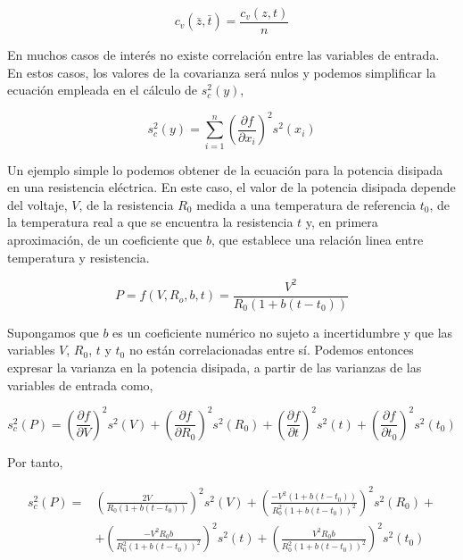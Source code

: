 \begin{equation*}
c_v(\bar{z},\bar{t}) =\frac{c_v(z,t)}{n}
\end{equation*}

En muchos casos de interés no existe correlación entre las variables de entrada. En estos casos, los valores de la covarianza será nulos y podemos simplificar la ecuación empleada en el cálculo de $s_c^2(y)$,

\begin{equation*}
s_c^2(y) = \sum_{i=1}^n\left(\frac{\partial f}{\partial x_i}\right)^2 s^2(x_i)
\end{equation*}


Un ejemplo simple lo podemos obtener de la ecuación para la potencia disipada en una resistencia eléctrica. En este caso, el valor de la potencia disipada depende del voltaje, $V$, de la resistencia $R_0$ medida a una temperatura de referencia $t_0$, de la temperatura real a que se encuentra la resistencia $t$ y, en primera aproximación, de un coeficiente que $b$, que establece una relación linea entre temperatura y resistencia. 

\begin{equation*}
P = f(V,R_o,b,t) = \frac{V^2}{R_0\left(1+b(t-t_0)\right)}
\end{equation*}

Supongamos que $b$ es un coeficiente numérico no sujeto a incertidumbre y que las  variables $V$, $R_0$, $t$ y $t_0$ no están correlacionadas entre sí. Podemos entonces expresar la varianza  en la  potencia disipada, a partir de las varianzas de las variables de entrada como,

\begin{equation*}
s_c^2(P) = \left(\frac{\partial f}{\partial V}\right)^2 s^2(V)+ \left(\frac{\partial f}{\partial R_0}\right)^2 s^2(R_0)+ \left(\frac{\partial f}{\partial t}\right)^2 s^2(t)+\left(\frac{\partial f}{\partial t_0}\right)^2 s^2(t_0)    
\end{equation*}

Por tanto,

\begin{align*}
s_c^2(P) =& \left(\frac{2V}{R_0\left(1+b(t-t_0)\right)}\right)^2 s^2(V)+ \left(\frac{-V^2\left(1+b(t-t_0)\right)}{R_0^2\left(1+b(t-t_0)\right)^2}\right)^2 s^2(R_0)+\\
&+ \left(\frac{-V^2R_0b}{R_0^2\left(1+b(t-t_0)\right)^2}\right)^2 s^2(t)+\left(\frac{V^2R_0b}{R_0^2\left(1+b(t-t_0)\right)^2}\right)^2 s^2(t_0)    
\end{align*}

